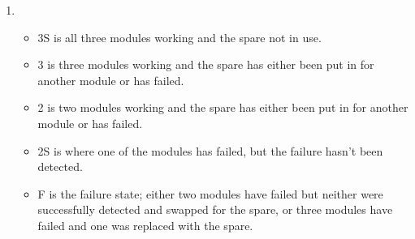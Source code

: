\documentclass[a4paper,12pt]{article}
\begin{document}
\begin{enumerate}
\begin{enumerate}
            \end{enumerate}

        \item
            \begin{itemize}
                \item 3S is all three modules working and the spare not in use.
                \item 3 is three modules working and the spare has either been put in for another module or has failed.
                \item 2 is two modules working and the spare has either been put in for another module or has failed.
                \item 2S is where one of the modules has failed, but the failure hasn't been detected.
                \item F is the failure state; either two modules have failed but neither were successfully detected and swapped for the spare, or three modules have failed and one was replaced with the spare.
            \end{itemize}

            \begin{center}
            \end{center}


\end{enumerate}
\end{document}
